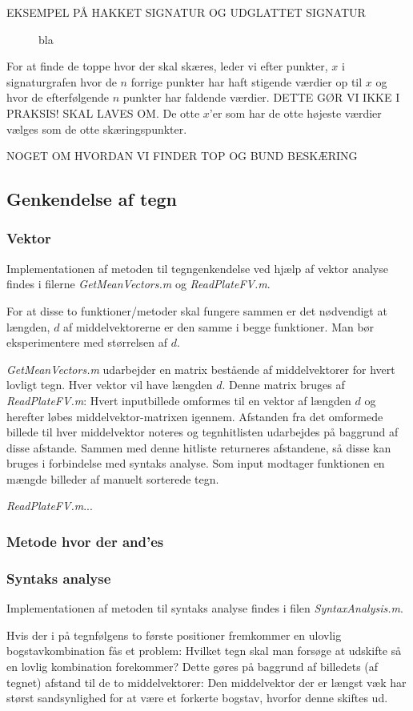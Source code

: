 EKSEMPEL PÅ HAKKET SIGNATUR OG UDGLATTET SIGNATUR

\begin{figure}[htp]
\label{fig:smoothSig}
\caption{bla}
\end{figure}

For at finde de toppe hvor der skal skæres, leder vi efter punkter, $x$ i signaturgrafen hvor de $n$ forrige punkter har haft stigende værdier op til $x$ og hvor de efterfølgende $n$ punkter har faldende værdier. DETTE GØR VI IKKE I PRAKSIS! SKAL LAVES OM. De otte $x$'er som har de otte højeste værdier vælges som de otte skæringspunkter.

NOGET OM HVORDAN VI FINDER TOP OG BUND BESKÆRING

\subsection{Genkendelse af tegn}

\subsubsection{Vektor}

Implementationen af metoden til tegngenkendelse ved hjælp af vektor analyse findes i filerne \textit{GetMeanVectors.m} og \textit{ReadPlateFV.m}.

For at disse to funktioner/metoder skal fungere sammen er det nødvendigt at længden, $d$ af middelvektorerne er den samme i begge funktioner. Man bør eksperimentere med størrelsen af $d$.

\textit{GetMeanVectors.m} udarbejder en matrix bestående af middelvektorer for hvert lovligt tegn. Hver vektor vil have længden $d$. Denne matrix bruges af \textit{ReadPlateFV.m}: Hvert inputbillede omformes til en vektor af længden $d$ og herefter løbes middelvektor-matrixen igennem. Afstanden fra det omformede billede til hver middelvektor noteres og tegnhitlisten udarbejdes på baggrund af disse afstande. Sammen med denne hitliste returneres afstandene, så disse kan bruges i forbindelse med syntaks analyse.
Som input modtager funktionen en mængde billeder af manuelt sorterede tegn.

\textit{ReadPlateFV.m}...


\subsubsection{Metode hvor der and'es}

\subsubsection{Syntaks analyse}

Implementationen af metoden til syntaks analyse findes i filen \textit{SyntaxAnalysis.m}.

Hvis der i på tegnfølgens to første positioner fremkommer en ulovlig bogstavkombination fås et problem: Hvilket tegn skal man forsøge at udskifte så en lovlig kombination forekommer? Dette gøres på baggrund af billedets (af tegnet) afstand til de to middelvektorer: Den middelvektor der er længst væk har størst sandsynlighed for at være et forkerte bogstav, hvorfor denne skiftes ud.